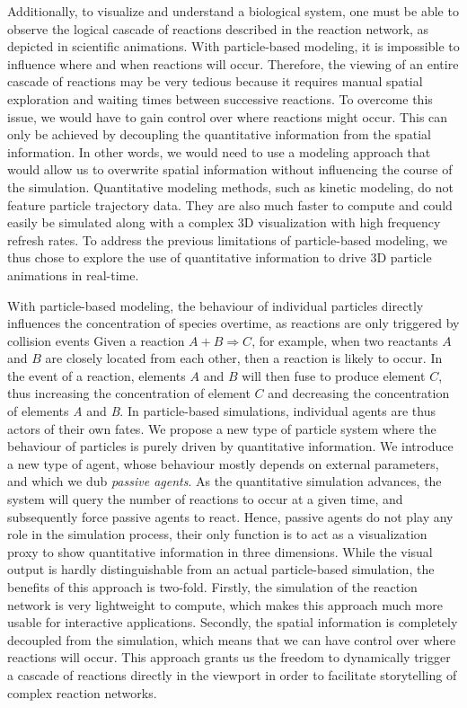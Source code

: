 Additionally, to visualize and understand a biological system, one must be able to observe the logical cascade of reactions described in the reaction network, as depicted in scientific animations.
With particle-based modeling, it is impossible to influence where and when reactions will occur.
Therefore, the viewing of an entire cascade of reactions may be very tedious because it requires manual spatial exploration and waiting times between successive reactions.
To overcome this issue, we would have to gain control over where reactions might occur.
This can only be achieved by decoupling the quantitative information from the spatial information.
In other words, we would need to use a modeling approach that would allow us to overwrite spatial information without influencing the course of the simulation.
Quantitative modeling methods, such as kinetic modeling, do not feature particle trajectory data.
They are also much faster to compute and could easily be simulated along with a complex 3D visualization with high frequency refresh rates.
To address the previous limitations of particle-based modeling, we thus chose to explore the use of quantitative information to drive 3D particle animations in real-time.

With particle-based modeling, the behaviour of individual particles directly influences the concentration of species overtime, as reactions are only triggered by collision events
Given a reaction $A + B \Rightarrow C$, for example, when two reactants $A$ and $B$ are closely located from each other, then a reaction is likely to occur.
In the event of a reaction, elements $A$ and $B$ will then fuse to produce element $C$, thus increasing the concentration of element $C$ and decreasing the concentration of elements \textit{A} and \textit{B}.
In particle-based simulations, individual agents are thus actors of their own fates.
We propose a new type of particle system where the behaviour of particles is purely driven by quantitative information.
We introduce a new type of agent, whose behaviour mostly depends on external parameters, and which we dub \emph{passive agents}.
As the quantitative simulation advances, the system will query the number of reactions to occur at a given time, and subsequently force passive agents to react.
Hence, passive agents do not play any role in the simulation process, their only function is to act as a visualization proxy to show quantitative information in three dimensions.
While the visual output is hardly distinguishable from an actual particle-based simulation, the benefits of this approach is two-fold.
Firstly, the simulation of the reaction network is very lightweight to compute, which makes this approach much more usable for interactive applications.
Secondly, the spatial information is completely decoupled from the simulation, which means that we can have control over where reactions will occur.
This approach grants us the freedom to dynamically trigger a cascade of reactions directly in the viewport in order to facilitate storytelling of complex reaction networks.

